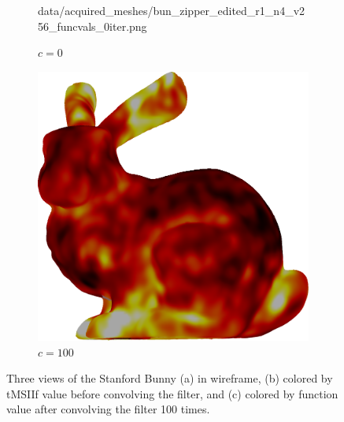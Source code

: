 \begin{figure}[ht]
\begin{subfigure}[b]{0.32\linewidth}
		{data/acquired_meshes/bun_zipper_edited_r1_n4_v256_funcvals_0iter.png}
		\caption{$c=0$}\label{fig:bun.b}
	\end{subfigure}
	\begin{subfigure}[b]{0.32\linewidth}
		\includegraphics[width=\linewidth]
		{data/acquired_meshes/bun_zipper_edited_r1_n4_v256_funcvals_100iter.png}
		\caption{$c=100$}\label{fig:bun.c}
	\end{subfigure}
	\caption[Three Views of the Stanford Bunny]{Three views of the Stanford Bunny (a) in wireframe, (b) colored by \gls{tMSIIf} value before convolving the filter, and (c) colored by function value after convolving the filter 100 times.}
	\label{fig:bun}
\end{figure}
